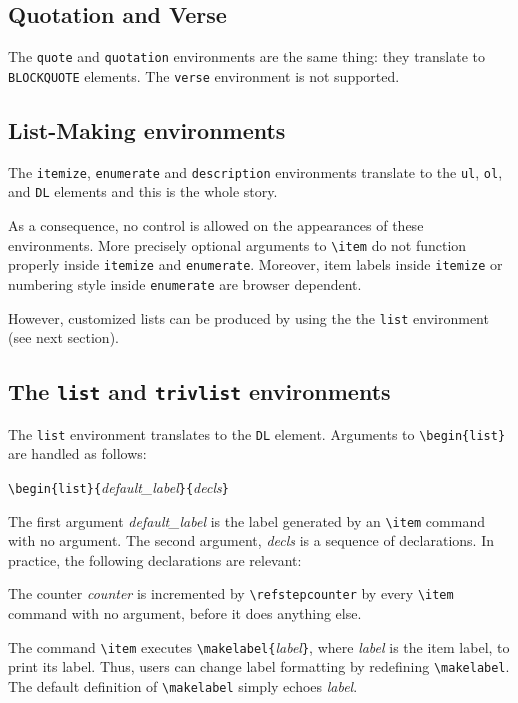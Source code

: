 \subsection{Quotation and Verse}
The \verb+quote+ and \verb+quotation+ environments are the same thing: they
translate to \verb+BLOCKQUOTE+ elements.
The \verb+verse+ environment is not supported.

\subsection{List-Making environments}
The \verb+itemize+, \verb+enumerate+ and \verb+description+
environments translate to the \verb+ul+, \verb+ol+, and
\verb+DL+ elements and this is the whole story.

As a consequence, no control is allowed on the appearances of these
environments.  More precisely optional arguments to \verb+\item+ do not
function properly inside \verb+itemize+ and \verb+enumerate+.  Moreover, item
labels inside \verb+itemize+ or numbering style inside \verb+enumerate+
are browser dependent.

However, customized lists can be produced by using the
the \texttt{list} environment (see next section).


\subsection{The \protect\texttt{list} and \protect\texttt{trivlist}
environments}
The \verb+list+ environment translates to the
\verb+DL+ element.
Arguments to \verb+\begin{list}+ are handled as follows:

\begin{flushleft}
\quad\verb+\begin{list}{+{\it default\_label}\verb+}{+{\it decls}\verb+}+
\end{flushleft}

The first argument {\it default\_label} is the label generated by an
\verb+\item+ command with no argument.
The second argument, {\it decls} is a sequence of declarations.
In practice, the following declarations are relevant:
\begin{list}{}{}
\item[\texttt{\char92 usecounter\{}\textit{counter}\texttt{\}}]
The counter {\it counter} is incremented by \verb+\refstepcounter+
by every \verb+\item+ command with no argument, before it does
anything else.
\item[\texttt{\char92 renewcommand\{\char92
makelabel\}[1]\{}\ldots\texttt{\}}]
The command \verb+\item+ executes
\verb+\makelabel{+{\it label}\verb+}+, where {\it label} is the item
label, to print its label.
Thus, users can change label formatting by redefining
\verb+\makelabel+.
The default definition of \verb+\makelabel+ simply echoes \textit{label}.
\end{list}

